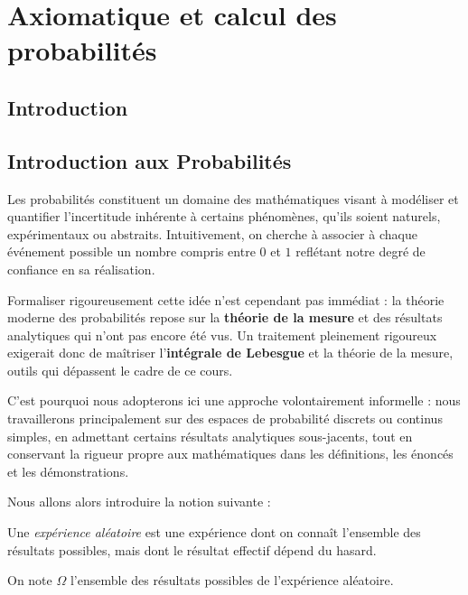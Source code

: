 \chapter{Axiomatique et calcul des probabilités}
\section{Introduction}

\section*{Introduction aux Probabilités}

Les probabilités constituent un domaine des mathématiques visant à modéliser et quantifier l'incertitude inhérente à certains phénomènes, qu'ils soient naturels, expérimentaux ou abstraits. Intuitivement, on cherche à associer à chaque \og événement possible \fg{} un nombre compris entre $0$ et $1$ reflétant notre degré de confiance en sa réalisation.

\medskip 

Formaliser rigoureusement cette idée n'est cependant pas immédiat : la théorie moderne des probabilités repose sur la \textbf{théorie de la mesure} et des résultats analytiques qui n'ont pas encore été vus. Un traitement pleinement rigoureux exigerait donc de maîtriser l'\textbf{intégrale de Lebesgue} et la théorie de la mesure, outils qui dépassent le cadre de ce cours. 

\medskip

C'est pourquoi nous adopterons ici une approche volontairement informelle : nous travaillerons principalement sur des espaces de probabilité discrets ou continus simples, en admettant certains résultats analytiques sous-jacents, tout en conservant la rigueur propre aux mathématiques dans les définitions, les énoncés et les démonstrations.

Nous allons alors introduire la notion suivante :

\begin{definition}
    Une \emph{expérience aléatoire} est une expérience dont on connaît l'ensemble des résultats possibles, mais dont le résultat effectif dépend du hasard.
\end{definition}

\begin{notation}
    On note $\Omega$ l'ensemble des résultats possibles de l'expérience aléatoire.
\end{notation}

